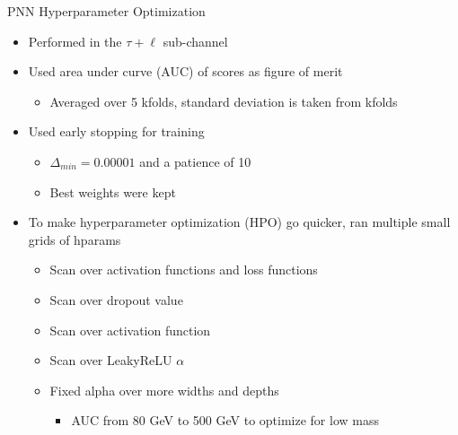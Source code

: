 \documentclass[aspectratio=169,xcolor=table]{beamer}
\begin{document}
    \begin{frame}[t]{PNN Hyperparameter Optimization}
      \begin{itemize}
        \item Performed in the $\tau+\ell$ sub-channel
        \item Used area under curve (AUC) of scores as figure of merit
        \begin{itemize}
          \item Averaged over 5 kfolds, standard deviation is taken from kfolds
        \end{itemize}
          \item Used early stopping for training
          \begin{itemize}
            \item $\Delta_{min}=0.00001$ and a patience of 10
            \item Best weights were kept
          \end{itemize}
        \item To make hyperparameter optimization (HPO) go quicker, ran multiple small grids of hparams
        \begin{itemize}
          \item Scan over activation functions and loss functions
          \item Scan over dropout value
          \item Scan over activation function
          \item Scan over LeakyReLU $\alpha$
          \item Fixed alpha over more widths and depths
          \begin{itemize}
            \item AUC from 80 GeV to 500 GeV to optimize for low mass
          \end{itemize}
        \end{itemize}
      \end{itemize}
    \end{frame}
\end{document}
